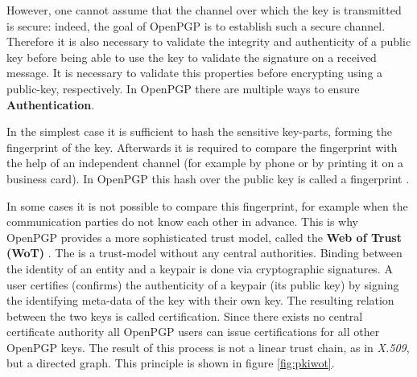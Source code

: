 
However, one cannot assume that the channel over which the key is transmitted is
secure: indeed, the goal of OpenPGP is to establish such a secure channel.
Therefore it is also necessary to validate the integrity and authenticity of a public key before being able to use the key to validate the signature on a received message. It is necessary to validate this properties before encrypting using a public-key, respectively. In OpenPGP there are multiple ways to ensure \textbf{Authentication}.

In the simplest case it is sufficient to hash the sensitive key-parts, forming the fingerprint of the key. Afterwards it is required to compare the fingerprint with the help of an independent channel (for example by phone or by printing it on a business card). In OpenPGP this hash over the public key is called a fingerprint \cite[section 12]{RFC4880}.


In some cases it is not possible to compare this fingerprint, for example when the communication parties do not know each other in advance. This is why OpenPGP provides a more sophisticated trust model, called the \textbf{Web of Trust (WoT)} \cite{PGP2manual}. The  is a trust-model without any central authorities. Binding between the identity of an entity and a keypair is done via cryptographic signatures. A user certifies (confirms) the authenticity of a keypair (its public key) by signing the identifying meta-data of the key with their own key. The resulting relation between the two keys is called certification. Since there exists no central certificate authority all OpenPGP users can issue certifications for all other OpenPGP keys. The result of this process is not a linear trust chain, as in \textit{X.509}, but a directed graph. This principle is shown in figure \ref{fig:pkiwot}. \\


